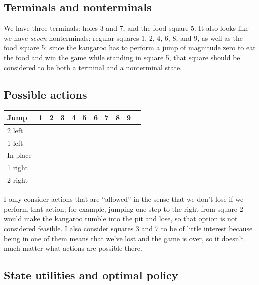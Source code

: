 \documentclass[letterpaper, 10pt]{article}
\begin{document}
\begin{multicols*}{2}
\subsection{Terminals and nonterminals}
We have three terminals: holes 3 and 7, and the food square 5. It also looks like we have \emph{seven} nonterminals: regular squares 1, 2, 4, 6, 8, and 9, as well as the food square 5: since the kangaroo has to perform a jump of magnitude zero to eat the food and win the game while standing in square 5, that square should be considered to be both a terminal and a nonterminal state. 

\subsection{Possible actions}
\begin{tabular}{lcccccccccc}
	Jump & 1 & 2 & 3 & 4 & 5 & 6 & 7 & 8 & 9 \\
	\midrule
	2 left   & \checkmark & \checkmark & & \checkmark & & \checkmark & & \checkmark &  \\
	1 left   & \checkmark & \checkmark & & & \checkmark & \checkmark & & & \checkmark \\
	In place & \checkmark & \checkmark & & \checkmark & \checkmark & \checkmark & & \checkmark & \checkmark \\
	1 right  & \checkmark & & & \checkmark & \checkmark & & & \checkmark & \checkmark \\
	2 right  & & \checkmark & & \checkmark & & \checkmark & & \checkmark & \checkmark \\
\end{tabular}

\vspace{10pt}

\noindent 
I only consider actions that are ``allowed'' in the sense that we don't lose if we perform that action; for example, jumping one step to the right from square 2 would make the kangaroo tumble into the pit and lose, so that option is not considered feasible. I also consider squares 3 and 7 to be of little interest because being in one of them means that we've lost and the game is over, so it doesn't much matter what actions are possible there.

\subsection{State utilities and optimal policy}


\end{multicols*}
\clearpage
\appendix
\end{document}
